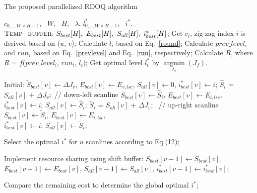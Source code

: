 \documentclass[lettersize,journal]{IEEEtran}
\begin{document}
\begin{algorithm}[!ht]
  \renewcommand{\algorithmicrequire}{\textbf{Input:}}
  \renewcommand{\algorithmicensure}{\textbf{Output:}}
  \caption{The proposed parallelized RDOQ algorithm}
  \label{the proposed LNPD algorithm}
	\begin{algorithmic}[1] 
	\REQUIRE  $c_{0,..,W \times H-1}$, \ $W$, \ $H$, \ $\lambda$.      
	\ENSURE $l_{0,..,W \times H-1}^{*}$, \ $i_{}^{*}$. \\      
	\STATE $\textsc{Temp \ buffer:} \ S_{best}[H], \ E_{best}[H], \ S_{all}[H], \ i_{best}^{*}[H]$;
	\STATE Get $c_{i}$, zig-zag index $i$ is derived based on ($u$, $v$);
	\STATE Calculate $l_{i}$ based on Eq.~\eqref{round};
	\STATE Calculate $prev\_level_{i}$ and $run_{i}$ based on Eq.~\eqref{prevlevel} and Eq.~\eqref{run}, respectively;
	\STATE Calculate $R$, where $R$ = $f$\;($prev\_level_{i}$, $run_{i}$, $l_{i}$);
	\STATE Get optimal level $l_{i}^{*}$ by $ \mathop{\arg\min}\limits_{ L_{i} } \left ( J_{f} \right) $.

		\STATE Initial: $\widetilde{S}_{best}[v] \gets \Delta J_{v}$, ${E}_{best}[v] \gets E_{v,lsc}$, ${S}_{all}[v] \gets 0$, $i_{best}^{*}[v] \gets i$;
	\ELSE
		    \STATE $\hat{S}_{i}$ = ${S}_{all}[v]$ +  $\Delta{J}_{v}$;\ // down-left scanline
	    	\STATE ${S}_{best}[v] \gets \hat{S}_{i}$, ${E}_{best}[v] \gets {E}_{i,lsc}$, \\ $i_{best}^{*}[v] \gets i$;
		    \ENDIF
		    \STATE ${S}_{all}[v] \gets \hat{S}_{i}$;
		\ELSE 
	    	\STATE $\widetilde{S}_{i}$ = ${S}_{all}[v]$ + $\Delta{J}_{v}$; \ // up-right scanline
	    	\STATE ${S}_{best}[v] \gets \widetilde{S}_{i}$, ${E}_{best}[v] \gets {E}_{i,lsc}$, \\ $i_{best}^{*}[v] \gets i$;
	    	\ENDIF
	    	\STATE ${S}_{all}[v] \gets \widetilde{S}_{i}$;
		\ENDIF
	\ENDIF
	
	\ENDFOR       %
	\STATE Select the optimal $i_{}^{*}$ for $u$ scanlines according to Eq.(12);
	
	\STATE Implement resource sharing using shift buffer: ${S}_{best}[v-1] \gets {S}_{best}[v]$, ${E}_{best}[v-1] \gets {E}_{best}[v]$, ${S}_{all}[v-1] \gets {S}_{all}[v]$, ${i}_{best}^{*}[v-1] \gets {i}_{best}^{*}[v]$;
	\ENDFOR
	
	\ENDFOR       %

	\STATE Compare the remaining cost to determine the global optimal $i_{}^{*}$;
	\ENDFOR
	\end{algorithmic}
\end{algorithm}
\end{document}
